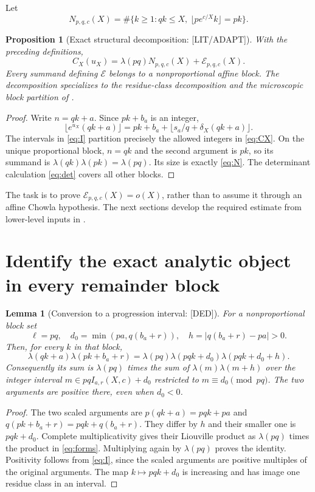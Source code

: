 \documentclass[11pt,a4paper]{article}
\numberwithin{equation}{section}
\newtheorem{lemma}[theorem]{Lemma}
\newtheorem{proposition}[theorem]{Proposition}
\theoremstyle{remark}\newtheorem{remark}[theorem]{Remark}
\newcommand{\1}{\mathbf 1}
\begin{document}
Let
\begin{equation}\label{eq:N}
 N_{p,q,c}(X)=\#\{k\ge1:qk\le X,\ \lfloor pe^{c/X}k\rfloor=pk\}.
\end{equation}
\begin{proposition}[Exact structural decomposition: {\rm[LIT/ADAPT]}]
\label{prop:split}
With the preceding definitions,
\begin{equation}\label{eq:split}
 \boxed{\ C_X(u_X)=\lambda(pq)N_{p,q,c}(X)+\mathcal E_{p,q,c}(X).\ }
\end{equation}
Every summand defining $\mathcal E$ belongs to a nonproportional affine
block. The decomposition specializes to the residue-class decomposition
and the microscopic block partition of \cite[Sections 3 and 5]{resonance}.
\end{proposition}
\begin{proof}
Write $n=qk+a$. Since $pk+b_a$ is an integer,
\[
 \lfloor e^{u_X}(qk+a)\rfloor
 =pk+b_a+\lfloor s_a/q+\delta_X(qk+a)\rfloor.
\]
The intervals in \eqref{eq:I} partition precisely the allowed integers
in \eqref{eq:CX}. On the unique proportional block, $n=qk$ and the
second argument is $pk$, so its summand is
$\lambda(qk)\lambda(pk)=\lambda(pq)$. Its size is exactly \eqref{eq:N}.
The determinant calculation \eqref{eq:det} covers all other blocks.
\end{proof}

The task is to prove $\mathcal E_{p,q,c}(X)=o(X)$, rather than to
assume it through an affine Chowla hypothesis. The next sections develop
the required estimate from lower-level inputs in \cite{final}.

\section{Identify the exact analytic object in every remainder block}
\label{sec:conversion}

\begin{lemma}[Conversion to a progression interval: {\rm[DED]}]
\label{lem:conversion}
For a nonproportional block set
\[
 \ell=pq,\quad d_0=\min(pa,q(b_a+r)),\quad
 h=|q(b_a+r)-pa|>0.
\]
Then, for every $k$ in that block,
\begin{equation}\label{eq:conversion}
 \lambda(qk+a)\lambda(pk+b_a+r)
 =\lambda(pq)\lambda(pqk+d_0)\lambda(pqk+d_0+h).
\end{equation}
Consequently its sum is $\lambda(pq)$ times the sum of
$\lambda(m)\lambda(m+h)$ over the integer interval
$m\in pqI_{a,r}(X,c)+d_0$ restricted to $m\equiv d_0\pmod{pq}$.
The two arguments are positive there, even when $d_0<0$.
\end{lemma}
\begin{proof}
The two scaled arguments are $p(qk+a)=pqk+pa$ and
$q(pk+b_a+r)=pqk+q(b_a+r)$. They differ by $h$ and their smaller
one is $pqk+d_0$. Complete multiplicativity gives their Liouville
product as $\lambda(pq)$ times the product in \eqref{eq:forms}.
Multiplying again by $\lambda(pq)$ proves the identity. Positivity
follows from \eqref{eq:I}, since the scaled arguments are positive
multiples of the original arguments. The map $k\mapsto pqk+d_0$
is increasing and has image one residue class in an interval.
\end{proof}
\end{document}
